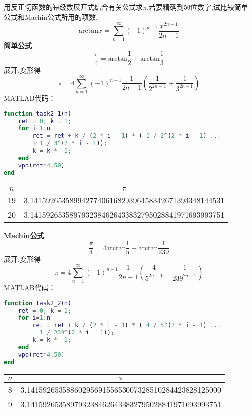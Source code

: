 \documentclass[12pt]{article}
\begin{document}
\begin{CJK*}{UTF8}{gbsn}
\subsection{}
	用反正切函数的幂级数展开式结合有关公式求$\pi$,若要精确到50位数字,试比较简单公式和Machin公式所用的项数.\\
	$$\mathrm{arctan}x=\sum_{n=1}^{\infty}(-1)^{n-1}\dfrac{x^{2n-1}}{2n-1}$$
	\textbf{简单公式}\\
	$$\dfrac{\pi}{4}=\mathrm{arctan}\dfrac{1}{2}+\mathrm{arctan}\dfrac{1}{3}$$
	展开,变形得\\
	$$\pi=4\sum_{n=1}^\infty (-1)^{n-1}\dfrac{1}{2n-1}\left(\dfrac{1}{2^{2n-1}}+\dfrac{1}{3^{2n-1}}\right)$$
	MATLAB代码：
	\begin{lstlisting}[language = matlab]
function task2_1(n)
    ret = 0; k = 1;
    for i=1:n
        ret = ret + k / (2 * i - 1) * ( 1 / 2^(2 * i - 1) ...
        + 1 / 3^(2 * i - 1));
        k = k * -1; 
    end
    vpa(ret*4,50)
end
	\end{lstlisting}
	\begin{tabular}{|c|c|}
	\hline
	$n$ & $\pi$\\
	\hline 
	19 & 3.1415926535899427740616829396458342671394348144531 \\ 
	\hline 
	20 & 3.1415926535897932384626433832795028841971693993751 \\ 
	\hline 
	\end{tabular} 
	
	\textbf{Machin公式}\\
	$$\dfrac{\pi}{4}=4\mathrm{arctan}\dfrac{1}{5}-\mathrm{arctan}\dfrac{1}{239}$$
	展开,变形得\\
	$$\pi=4\sum_{n=1}^\infty (-1)^{n-1}\dfrac{1}{2n-1}\left(\dfrac{4}{5^{2n-1}}-\dfrac{1}{239^{2n-1}}\right)$$
	MATLAB代码：
	\begin{lstlisting}[language = matlab]
function task2_2(n)
    ret = 0; k = 1;
    for i=1:n
        ret = ret + k / (2 * i - 1) * ( 4 / 5^(2 * i - 1) ...
        - 1 / 239^(2 * i - 1));
        k = k * -1; 
    end
    vpa(ret*4,50)
end
	\end{lstlisting}
	
	\begin{tabular}{|c|c|}
	\hline
	$n$ & $\pi$ \\
	\hline 
	8 & 3.1415926535886029569155653007328510284423828125000 \\ 
	\hline 
	9 & 3.1415926535897932384626433832795028841971693993751 \\ 
	\hline 
	\end{tabular} 


\end{CJK*}
\end{document}
